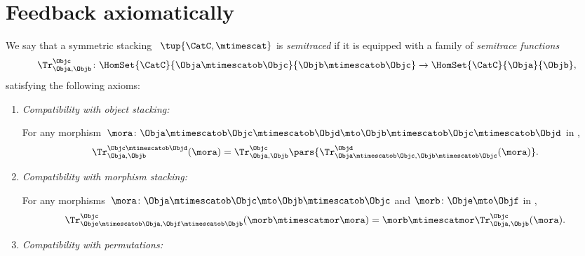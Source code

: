 \section{Feedback axiomatically}



    \begin{ctdefinition}
        \label{def:semitraced-assoc-stack-scat}
        We say that a symmetric stacking ~$\tup{\CatC, \mtimescat }$ is \emph{semitraced} if it is equipped with a family of \emph{semitrace functions}
        \begin{equation}
            \Tr_{\Obja,\Objb}^\Objc\colon \HomSet{\CatC}{\Obja \mtimescatob \Objc}{\Objb\mtimescatob \Objc}\to \HomSet{\CatC}{\Obja}{\Objb},
        \end{equation}
        satisfying the following axioms:
        \begin{enumerate}

            \item \emph{Compatibility with object stacking:}
            
                  For any morphism~$\mora \colon \Obja\mtimescatob \Objc \mtimescatob \Objd \mto \Objb\mtimescatob \Objc \mtimescatob \Objd$ in \CatC,
                  \begin{equation}
                      \label{eq:semicat-semitrace-vanishing_2}
                      \Tr_{\Obja,\Objb}^{\Objc\mtimescatob \Objd}(\mora)=\Tr_{\Obja,\Objb}^\Objc\pars{
                          \Tr_{\Obja \mtimescatob \Objc, \Objb \mtimescatob \Objc}^\Objd(\mora)}.
                  \end{equation}

            \item \emph{Compatibility with morphism stacking:}
            
                  For any morphisms~$\mora\colon \Obja\mtimescatob \Objc \mto \Objb\mtimescatob \Objc$ and $\morb \colon \Obje \mto \Objf$ in \CatC,
                  \begin{equation}
                      \label{eq:semicat-semitrace-superposing}
                      \Tr_{\Obje\mtimescatob \Obja,\Objf\mtimescatob \Objb}^{\Objc}(\morb \mtimescatmor \mora)=\morb \mtimescatmor \Tr_{\Obja,\Objb}^\Objc(\mora).
                  \end{equation}
                  
                  \item \emph{Compatibility with permutations:}
                  

        \end{enumerate}
    \end{ctdefinition}
    
